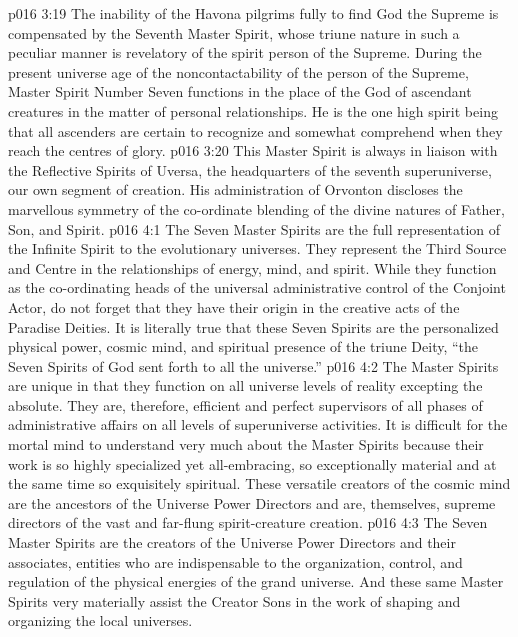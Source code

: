 \vs p016 3:19 The inability of the Havona pilgrims fully to find God the Supreme is compensated by the Seventh Master Spirit, whose triune nature in such a peculiar manner is revelatory of the spirit person of the Supreme. During the present universe age of the noncontactability of the person of the Supreme, Master Spirit Number Seven functions in the place of the God of ascendant creatures in the matter of personal relationships. He is the one high spirit being that all ascenders are certain to recognize and somewhat comprehend when they reach the centres of glory.
\vs p016 3:20 This Master Spirit is always in liaison with the Reflective Spirits of Uversa, the headquarters of the seventh superuniverse, our own segment of creation. His administration of Orvonton discloses the marvellous symmetry of the co\hyp{}ordinate blending of the divine natures of Father, Son, and Spirit.
\vs p016 4:1 The Seven Master Spirits are the full representation of the Infinite Spirit to the evolutionary universes. They represent the Third Source and Centre in the relationships of energy, mind, and spirit. While they function as the co\hyp{}ordinating heads of the universal administrative control of the Conjoint Actor, do not forget that they have their origin in the creative acts of the Paradise Deities. It is literally true that these Seven Spirits are the personalized physical power, cosmic mind, and spiritual presence of the triune Deity, “the Seven Spirits of God sent forth to all the universe.”
\vs p016 4:2 The Master Spirits are unique in that they function on all universe levels of reality excepting the absolute. They are, therefore, efficient and perfect supervisors of all phases of administrative affairs on all levels of superuniverse activities. It is difficult for the mortal mind to understand very much about the Master Spirits because their work is so highly specialized yet all\hyp{}embracing, so exceptionally material and at the same time so exquisitely spiritual. These versatile creators of the cosmic mind are the ancestors of the Universe Power Directors and are, themselves, supreme directors of the vast and far\hyp{}flung spirit\hyp{}creature creation.
\vs p016 4:3 The Seven Master Spirits are the creators of the Universe Power Directors and their associates, entities who are indispensable to the organization, control, and regulation of the physical energies of the grand universe. And these same Master Spirits very materially assist the Creator Sons in the work of shaping and organizing the local universes.
